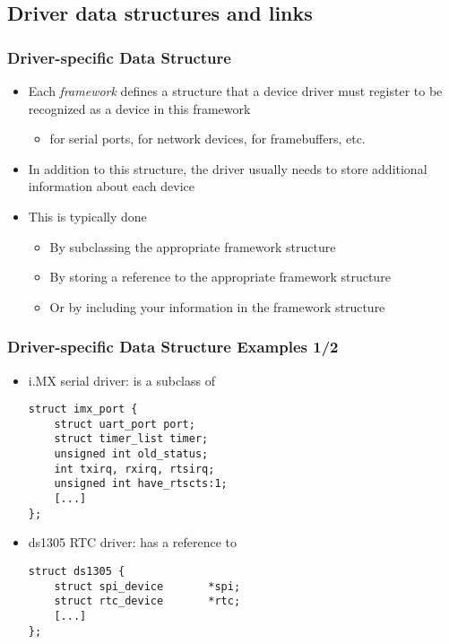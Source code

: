 \subsection{Driver data structures and links}

\begin{frame}
  \frametitle{Driver-specific Data Structure}
  \begin{itemize}
  \item Each \emph{framework} defines a structure that a device driver
    must register to be recognized as a device in this framework
    \begin{itemize}
    \item {} for serial ports,  for network
      devices,  for framebuffers, etc.
    \end{itemize}
  \item In addition to this structure, the driver usually needs to
    store additional information about each device
  \item This is typically done
    \begin{itemize}
    \item By subclassing the appropriate framework structure
    \item By storing a reference to the appropriate framework
      structure
    \item Or by including your information in the framework structure
    \end{itemize}
  \end{itemize}
\end{frame}

\begin{frame}[fragile]
  \frametitle{Driver-specific Data Structure Examples 1/2}
  \begin{itemize}
  \item i.MX serial driver:  is a subclass of
  \begin{verbatim}
struct imx_port {
    struct uart_port port;
    struct timer_list timer;
    unsigned int old_status;
    int txirq, rxirq, rtsirq;
    unsigned int have_rtscts:1;
    [...]
};
  \end{verbatim}
  \item ds1305 RTC driver:  has a reference to
  \begin{verbatim}
struct ds1305 {
    struct spi_device       *spi;
    struct rtc_device       *rtc;
    [...]
};
  \end{verbatim}
  \end{itemize}
\end{frame}

